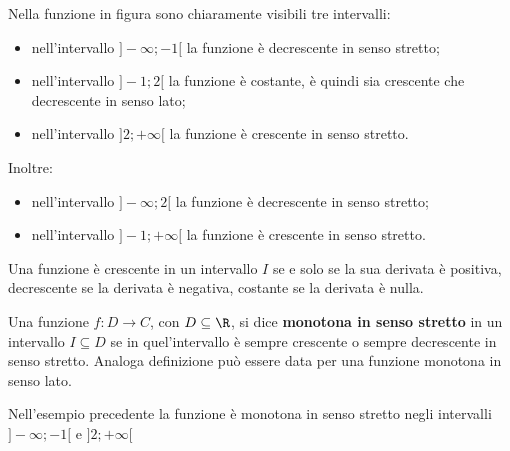 \documentclass{article}     %
\begin{document}
        Nella funzione in figura sono chiaramente visibili tre intervalli: 
        \begin{itemize}
            \item nell'intervallo $]-\infty;-1[$ la funzione è decrescente in senso stretto;
            \item nell'intervallo $]-1;2[$ la funzione è costante, è quindi sia crescente che decrescente in senso lato;
            \item nell'intervallo $]2;+\infty[$ la funzione è crescente in senso stretto.
        \end{itemize}
        Inoltre:
        \begin{itemize}
            \item nell'intervallo $]-\infty;2[$ la funzione è decrescente in senso stretto;
            \item nell'intervallo $]-1;+\infty[$ la funzione è crescente in senso stretto.
        \end{itemize}

        Una funzione è crescente in un intervallo $I$ se e solo se la sua derivata è positiva, decrescente se la derivata è negativa, costante se la derivata è nulla. 
        \begin{boxdef}
            Una funzione $f:D\rightarrow C$, con $D\subseteq\R$, si dice \textbf{monotona in senso stretto} in un intervallo $I\subseteq D$ se in quel'intervallo è sempre crescente o sempre decrescente in senso stretto. Analoga definizione può essere data per una funzione monotona in senso lato. 
        \end{boxdef}
        Nell'esempio precedente la funzione è monotona in senso stretto negli intervalli $]-\infty;-1[$ e $]2;+\infty[$
\end{document}
